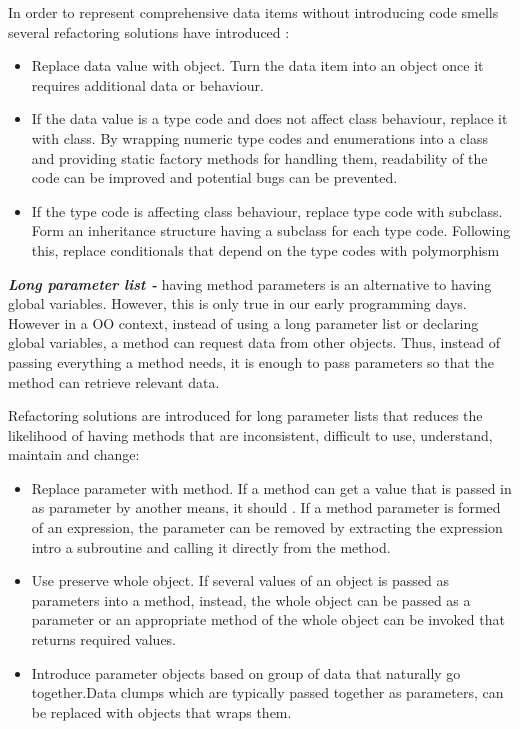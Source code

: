 In order to represent comprehensive data items without introducing code smells several refactoring solutions have introduced \cite{fowlerRefactor}:

\begin{itemize}
\item Replace data value with object. Turn the data item into an object once it requires additional data or behaviour.
\item If the data value is a type code and does not affect class behaviour, replace it with class. By wrapping numeric type codes and enumerations into a class and providing static factory methods for handling them, readability of the code can be improved and potential bugs can be prevented.  
\item If the type code is affecting class behaviour, replace type code with subclass. Form an inheritance structure having a subclass for each type code. Following this, replace conditionals that depend on the type codes with polymorphism
\end{itemize}

\textit{\textbf{Long parameter list -}} having method parameters is an alternative to having global variables. However, this is only true in our early programming days. However in a \gls{OO} context, instead of using a long parameter list or declaring global variables, a method can request data from other objects. Thus, instead of passing everything a method needs, it is enough to pass parameters so that the method can retrieve relevant data. 

Refactoring solutions are introduced for long parameter lists \cite{fowlerRefactor} that reduces the likelihood of having methods that are inconsistent, difficult to use, understand, maintain and change:

\begin{itemize}
\item Replace parameter with method. If a method can get a value that is passed in as parameter by another means, it should \cite{fowlerRefactor}. If a method parameter is formed of an expression, the parameter can be removed by extracting the expression intro a subroutine and calling it directly from the method. 
\item Use preserve whole object. If several values of an object is passed as parameters into a method, instead, the whole object can be passed as a parameter or an appropriate method of the whole object can be invoked that returns required values.
\item Introduce parameter objects based on group of data that naturally go together.Data clumps which are typically passed together as parameters, can be replaced with objects that wraps them. 
\end{itemize}

